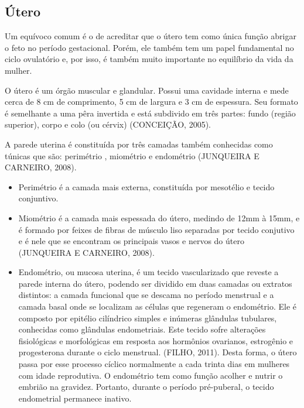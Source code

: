 \documentclass[12pt]{article} %
\begin{document}
\subsection{Útero}

Um equívoco comum é o de acreditar que o útero tem como única função
abrigar o feto no período gestacional. Porém, ele também tem um papel
fundamental no ciclo ovulatório e, por isso, é também muito importante
no equilíbrio da vida da mulher.

O útero é um órgão muscular e glandular. Possui uma cavidade interna e
mede cerca de 8 cm de comprimento, 5 cm de largura e 3 cm de
espessura. Seu formato é semelhante a uma pêra invertida e está
subdivido em três partes: fundo (região superior), corpo e colo (ou cérvix) (CONCEIÇÃO, 2005). %

A parede uterina é constituída por três camadas também conhecidas como túnicas que são: perimétrio , miométrio e endométrio (JUNQUEIRA E CARNEIRO, 2008).

\begin{itemize}
\item Perimétrio é a camada mais externa,
constituída por mesotélio e tecido conjuntivo.

\item Miométrio é a camada mais espessada do útero, medindo de 12mm à 15mm,
  e é formado por feixes de fibras de músculo liso separadas por
  tecido conjutivo e é nele que se encontram os principais vasos e
  nervos do útero (JUNQUEIRA E CARNEIRO, 2008).

\item Endométrio, ou mucosa uterina, é um tecido vascularizado que
  reveste a parede interna do útero, podendo ser dividido em duas
  camadas ou extratos distintos: a camada funcional que se descama no
  período menstrual e a camada basal onde se localizam as células que
  regeneram o endométrio. Ele é composto por epitélio cilíndrico
  simples e inúmeras glândulas tubulares, conhecidas como glândulas
  endometriais. Este tecido sofre alterações fisiológicas e
  morfológicas em resposta aos hormônios ovarianos, estrogênio e
  progesterona durante o ciclo menstrual. (FILHO, 2011).  Desta forma,
  o útero passa por esse processo cíclico normalmente a cada trinta
  dias em mulheres com idade reprodutiva.  O endométrio tem como
  função acolher e nutrir o embrião na gravidez. Portanto, durante o
  período pré-puberal, o tecido endometrial permanece inativo.
\end{itemize}
\end{document}
